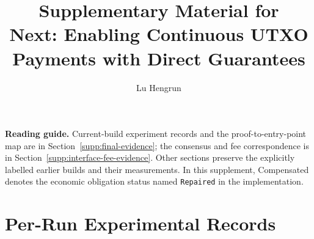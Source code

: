 \documentclass[letterpaper,11pt,onecolumn,journal]{IEEEtran}
\title{Supplementary Material for\\Next: Enabling Continuous UTXO Payments with Direct Guarantees}
\author{Lu Hengrun}
\begin{document}
\maketitle
\noindent\textbf{Reading guide.} Current-build experiment records and the proof-to-entry-point map are in Section~\ref{supp:final-evidence}; the consensus and fee correspondence is in Section~\ref{supp:interface-fee-evidence}. Other sections preserve the explicitly labelled earlier builds and their measurements. In this supplement, Compensated denotes the economic obligation status named \texttt{Repaired} in the implementation.








\clearpage
\section{Per-Run Experimental Records}



\end{document}
